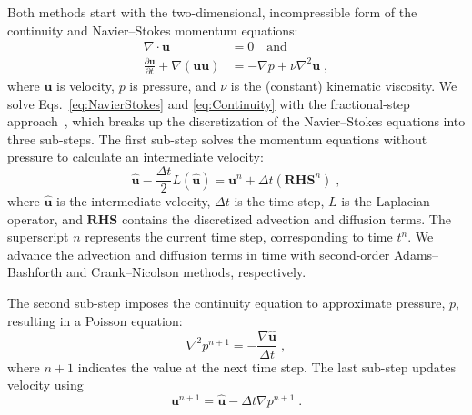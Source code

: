 \documentclass[preprint,12pt]{elsarticle}
\begin{document}
Both methods start with the two-dimensional, incompressible form of the continuity and Navier--Stokes momentum equations:
\begin{align}
\nabla \cdot \textbf{u} &= 0 \quad \text{and}  \label{eq:Continuity} \\
\frac{\partial \textbf{u}}{\partial t} + \nabla ( \textbf{uu} ) &= -\nabla p + \nu\nabla^{2}\textbf{u} \label{eq:NavierStokes} \;,
\end{align}
where $\textbf{u}$ is velocity, $p$ is pressure, and $\nu$ is the (constant) kinematic viscosity.
We solve Eqs.~\eqref{eq:NavierStokes} and \eqref{eq:Continuity} with the fractional-step approach~\cite{Perot1993}, which breaks up the discretization of the Navier--Stokes equations into three sub-steps.
The first sub-step solves the momentum equations without pressure to calculate an intermediate velocity:
\begin{equation}
\hat{\textbf{u}} - \frac{\Delta t}{2}L(\hat{\textbf{u}}) = \textbf{u}^n + \Delta t(\textbf{RHS}^n) \;,
\label{eq:Intermediate Velocity}
\end{equation}
where $\hat{\textbf{u}}$ is the intermediate velocity, $\Delta t$ is the time step, $L$ is the Laplacian operator, and $\textbf{RHS}$ contains the discretized advection and diffusion terms.
The superscript $n$ represents the current time step, corresponding to time $t^n$.
We advance the advection and diffusion terms in time with second-order Adams--Bashforth and Crank--Nicolson methods, respectively.

The second sub-step imposes the continuity equation to approximate pressure, $p$, resulting in a Poisson equation:
\begin{equation}\label{eq:Poisson}
\nabla^2p^{n+1} = - \frac{\nabla\hat{\textbf{u}}}{\Delta t} \;,
\end{equation}
\newline where $n+1$ indicates the value at the next time step.
The last sub-step updates velocity using
\begin{equation}\label{eq:Projection}
\textbf{u}^{n+1} = \hat{\textbf{u}} - \Delta t\nabla p^{n+1} \;.
\end{equation}


\end{document}
